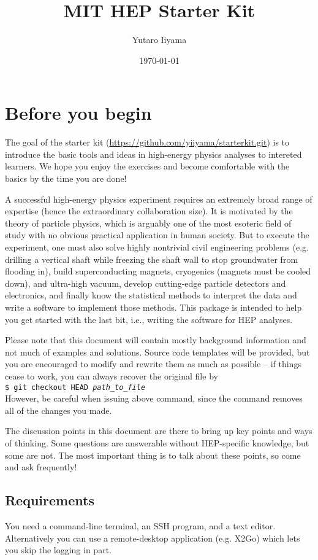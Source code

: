 \documentclass[12pt]{article}
\title{MIT HEP Starter Kit}
\author{Yutaro Iiyama}
\date{\today}
\newcommand{\terminal}[1]{\vspace{3pt}\texttt{\$ #1} \\}
\begin{document}
\maketitle

\section*{Before you begin}
The goal of the starter kit (\url{https://github.com/yiiyama/starterkit.git}) is to introduce the basic tools and ideas in high-energy physics analyses to intereted learners. We hope you enjoy the exercises and become comfortable with the basics by the time you are done!

A successful high-energy physics experiment requires an extremely broad range of expertise (hence the extraordinary collaboration size). It is motivated by the theory of particle physics, which is arguably one of the most esoteric field of study with no obvious practical application in human society. But to execute the experiment, one must also solve highly nontrivial civil engineering problems (e.g. drilling a vertical shaft while freezing the shaft wall to stop groundwater from flooding in), build superconducting magnets, cryogenics (magnets must be cooled down), and ultra-high vacuum, develop cutting-edge particle detectors and electronics, and finally know the statistical methods to interpret the data and write a software to implement those methods. This package is intended to help you get started with the last bit, i.e., writing the software for HEP analyses.

Please note that this document will contain mostly background information and not much of examples and solutions. Source code templates will be provided, but you are encouraged to modify and rewrite them as much as possible -- if things cease to work, you can always recover the original file by \\
\terminal{git checkout HEAD \textit{path\_to\_file}}
However, be careful when issuing above command, since the command removes all of the changes you made.

The discussion points in this document are there to bring up key points and ways of thinking. Some questions are answerable without HEP-specific knowledge, but some are not. The most important thing is to talk about these points, so come and ask frequently!

\subsection*{Requirements}
You need a command-line terminal, an SSH program, and a text editor. Alternatively you can use a remote-desktop application (e.g. X2Go) which lets you skip the logging in part.
\end{document}
